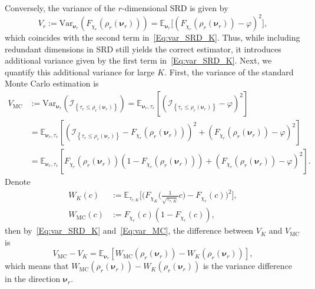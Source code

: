\documentclass[%
onefignum,onetabnum]{siamonline250211}
\newcommand{\bbE}{\mathbb E}
\newcommand{\cI}{\mathcal I} \newcommand{\cJ}{\mathcal J}
\begin{document}
Conversely, the variance of the $r$-dimensional SRD is given by
\begin{equation*}
    V_r := \mathrm{Var}_{\boldsymbol{\nu}_r} ( F_{\chi_r}(\rho_r(\boldsymbol{\nu}_r)) ) = \bbE_{\boldsymbol{\nu}_r} \big[ (F_{\chi_r}(\rho_r(\boldsymbol{\nu}_r))-\varphi)^2 \big],
\end{equation*}
which coincides with the second term in~\eqref{Eq:var_SRD_K}. Thus, while including redundant dimensions in SRD still yields the correct estimator, it introduces additional variance given by the first term in~\eqref{Eq:var_SRD_K}.
%
Next, we quantify this additional variance for large $K$.
First, the variance of the standard Monte Carlo estimation is
\begin{equation}\label{Eq:var_MC}
    \begin{aligned}
        V_{\mathrm{MC}} &:= \mathrm{Var}_{\boldsymbol{\nu}_r} \left( \cI_{\left\{ \tau_r\leq \rho_r(\boldsymbol{\nu}_r) \right\}} \right) = \bbE_{\boldsymbol{\nu}_r,\tau_r} \left[\left( \cI_{\left\{ \tau_r\leq \rho_r(\boldsymbol{\nu}_r) \right\}}-\varphi \right)^2\right] \\
        &= \bbE_{\boldsymbol{\nu}_r,\tau_r} \left[ \left( \cI_{\left\{ \tau_r\leq \rho_r(\boldsymbol{\nu}_r) \right\}}-F_{\chi_r}(\rho_r(\boldsymbol{\nu}_r)) \right)^2 + (F_{\chi_r}(\rho_r(\boldsymbol{\nu}_r))-\varphi)^2 \right] \\
        &= \bbE_{\boldsymbol{\nu}_r,\tau_r} \left[ F_{\chi_r}(\rho_r(\boldsymbol{\nu}_r))\left( 1-F_{\chi_r}(\rho_r(\boldsymbol{\nu}_r)) \right) + (F_{\chi_r}(\rho_r(\boldsymbol{\nu}_r))-\varphi)^2 \right].
    \end{aligned}
\end{equation}
%
Denote
\begin{equation}\label{Eq:Wk}
    \begin{aligned}
        W_K(c)&:=\bbE_{\tau_{r,K}} \bigg[ \Big( F_{\chi_K}\Big( \frac{1}{\sqrt{\tau_{r,K}}}c \Big)-F_{\chi_r}(c) \big)^2 \bigg], \\
        W_{\mathrm{MC}}(c)&:=F_{\chi_r}(c)\left( 1-F_{\chi_r}(c) \right),
    \end{aligned}
\end{equation}
then by~\eqref{Eq:var_SRD_K} and~\eqref{Eq:var_MC}, the difference between $V_K$ and $V_{\mathrm{MC}}$ is
\begin{equation}\label{Eq:V_diff}
    V_{\mathrm{MC}}-V_K=\bbE_{\boldsymbol{\nu}_r} \left[ W_{\mathrm{MC}}(\rho_r(\boldsymbol{\nu}_r))-W_K(\rho_r(\boldsymbol{\nu}_r)) \right],
\end{equation}
which means that $W_{\mathrm{MC}}(\rho_r(\boldsymbol{\nu}_r))-W_K(\rho_r(\boldsymbol{\nu}_r))$ is the variance difference in the direction $\boldsymbol{\nu}_r$.
\end{document}
